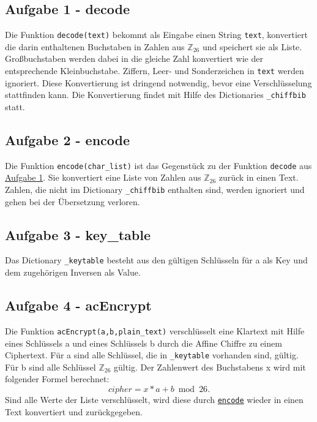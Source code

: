 \documentclass[12pt]{article}
\begin{document}
		\subsection{\label{ssec:Aufgabe1}Aufgabe 1 - decode}
			Die Funktion \texttt{decode(text)} bekommt als Eingabe einen String \texttt{text}, konvertiert die darin enthaltenen Buchstaben in Zahlen aus \(\mathbb{Z}_{26}\) und speichert sie als Liste. Gro{\ss}buchstaben werden dabei in die gleiche Zahl konvertiert wie der entsprechende Kleinbuchstabe. Ziffern, Leer- und Sonderzeichen in \texttt{text} werden ignoriert. Diese Konvertierung ist dringend notwendig, bevor eine Verschl\"usselung stattfinden kann. Die Konvertierung findet mit Hilfe des Dictionaries \texttt{\_chiffbib} statt.

	\newpage
	
			
			
		\subsection{\label{ssec:Aufgabe2}Aufgabe 2 - encode}
			Die Funktion \texttt{encode(char\_list)} ist das Gegenst\"uck zu der Funktion \texttt{decode} aus \hyperref[ssec:Aufgabe1]{Aufgabe 1}. Sie konvertiert eine Liste von Zahlen aus \(\mathbb{Z}_{26}\) zur\"uck in einen Text. Zahlen, die nicht im Dictionary  \texttt{\_chiffbib} enthalten sind, werden ignoriert und gehen bei der \"Ubersetzung verloren.
			
			
		\subsection{\label{ssec:Aufgabe3}Aufgabe 3 - key\_table}
			Das Dictionary \texttt{\_keytable} besteht aus den g\"ultigen Schl\"usseln f\"ur a als Key und dem zugeh\"origen Inversen als Value.
			
			
		\subsection{\label{ssec:Aufgabe4}Aufgabe 4 - acEncrypt}
		Die Funktion \texttt{acEncrypt(a,b,plain\_text)} verschl\"usselt eine Klartext mit Hilfe eines Schl\"ussels a und eines Schl\"ussels b durch die Affine Chiffre zu einem Ciphertext.
F\"ur a sind alle Schl\"ussel, die in \texttt{\_keytable} vorhanden sind, g\"ultig. F\"ur b sind alle Schl\"ussel \(\mathbb{Z}_{26}\) g\"ultig. 
Der Zahlenwert des Buchstabens x wird mit folgender Formel berechnet:
\[ cipher = x * a + b \bmod 26.\]
Sind alle Werte der Liste verschl\"usselt, wird diese durch \hyperref[ssec:Aufgabe2]{\texttt{encode}} wieder in einen Text konvertiert und zur\"uckgegeben.
			
			
			
\end{document}
